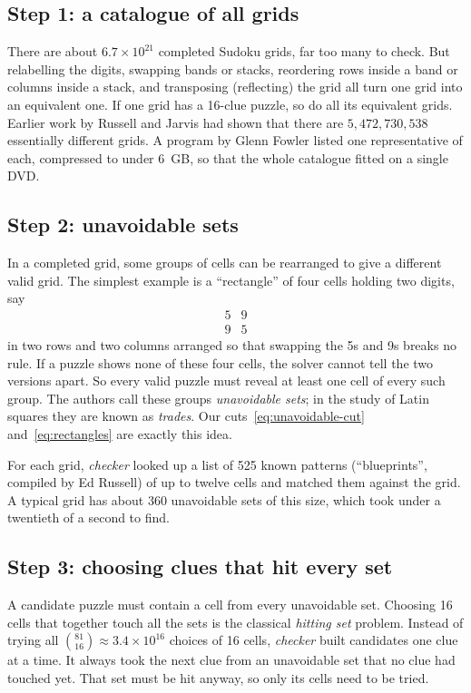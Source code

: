 \documentclass[11pt]{article}
\begin{document}
\subsection*{Step 1: a catalogue of all grids}

There are about $6.7\times10^{21}$ completed Sudoku grids, far too many to check. But relabelling the digits, swapping bands or stacks, reordering rows inside a band or columns inside a stack, and transposing (reflecting) the grid all turn one grid into an equivalent one. If one grid has a 16-clue puzzle, so do all its equivalent grids. Earlier work by Russell and Jarvis had shown that there are $5{,}472{,}730{,}538$ essentially different grids. A program by Glenn Fowler listed one representative of each, compressed to under 6~GB, so that the whole catalogue fitted on a single DVD.

\subsection*{Step 2: unavoidable sets}

In a completed grid, some groups of cells can be rearranged to give a different valid grid. The simplest example is a ``rectangle'' of four cells holding two digits, say
\[
\begin{matrix} 5 & 9\\ 9 & 5 \end{matrix}
\]
in two rows and two columns arranged so that swapping the 5s and 9s breaks no rule. If a puzzle shows none of these four cells, the solver cannot tell the two versions apart. So every valid puzzle must reveal at least one cell of every such group. The authors call these groups \emph{unavoidable sets}; in the study of Latin squares they are known as \emph{trades}. Our cuts~\eqref{eq:unavoidable-cut} and~\eqref{eq:rectangles} are exactly this idea.

For each grid, \emph{checker} looked up a list of 525 known patterns (``blueprints'', compiled by Ed Russell) of up to twelve cells and matched them against the grid. A typical grid has about 360 unavoidable sets of this size, which took under a twentieth of a second to find.

\subsection*{Step 3: choosing clues that hit every set}

A candidate puzzle must contain a cell from every unavoidable set. Choosing 16 cells that together touch all the sets is the classical \emph{hitting set} problem. Instead of trying all $\binom{81}{16}\approx3.4\times10^{16}$ choices of 16 cells, \emph{checker} built candidates one clue at a time. It always took the next clue from an unavoidable set that no clue had touched yet. That set must be hit anyway, so only its cells need to be tried.
\end{document}
